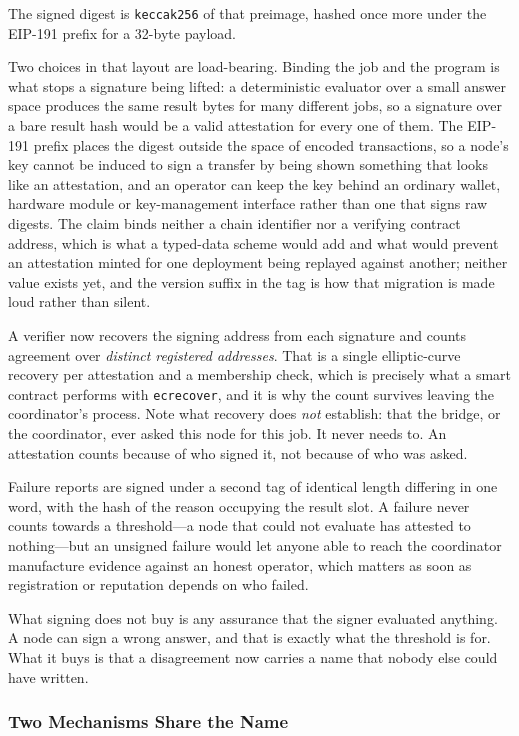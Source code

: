 \documentclass[12pt,a4paper]{article}
\begin{document}
The signed digest is \texttt{keccak256} of that preimage, hashed once more under the EIP-191 prefix for a 32-byte payload.

Two choices in that layout are load-bearing.
Binding the job and the program is what stops a signature being lifted: a deterministic evaluator over a small answer space produces the same result bytes for many different jobs, so a signature over a bare result hash would be a valid attestation for every one of them.
The EIP-191 prefix places the digest outside the space of encoded transactions, so a node's key cannot be induced to sign a transfer by being shown something that looks like an attestation, and an operator can keep the key behind an ordinary wallet, hardware module or key-management interface rather than one that signs raw digests.
The claim binds neither a chain identifier nor a verifying contract address, which is what a typed-data scheme would add and what would prevent an attestation minted for one deployment being replayed against another; neither value exists yet, and the version suffix in the tag is how that migration is made loud rather than silent.

A verifier now recovers the signing address from each signature and counts agreement over \emph{distinct registered addresses}.
That is a single elliptic-curve recovery per attestation and a membership check, which is precisely what a smart contract performs with \texttt{ecrecover}, and it is why the count survives leaving the coordinator's process.
Note what recovery does \emph{not} establish: that the bridge, or the coordinator, ever asked this node for this job.
It never needs to.
An attestation counts because of who signed it, not because of who was asked.

Failure reports are signed under a second tag of identical length differing in one word, with the hash of the reason occupying the result slot.
A failure never counts towards a threshold---a node that could not evaluate has attested to nothing---but an unsigned failure would let anyone able to reach the coordinator manufacture evidence against an honest operator, which matters as soon as registration or reputation depends on who failed.

What signing does not buy is any assurance that the signer evaluated anything.
A node can sign a wrong answer, and that is exactly what the threshold is for.
What it buys is that a disagreement now carries a name that nobody else could have written.

\subsubsection{Two Mechanisms Share the Name}
\end{document}
